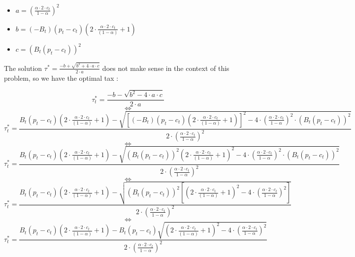 \documentclass{article}
\begin{document}
\begin{itemize}
    \item $a = \left(\frac{\alpha \cdot 2\cdot c_{t}}{1-\alpha}\right)^{2}$
    \item $b = \left(-B_{t}\right)\left(p_{t}-c_{t}\right)\left(2\cdot \frac{\alpha \cdot 2\cdot c_{t}}{(1-\alpha)}+1\right)$
    \item $c = \left(B_{t}(p_{t}-c_{t})\right)^{2}$
\end{itemize}
The solution $\tau^{*}=\frac{-b+\sqrt{b^2+4\cdot a\cdot c}}{2\cdot a}$ does not make sense in the context of this problem, so we have the optimal tax : 

\begin{equation*}
    \tau_{t}^{*}=\frac{-b-\sqrt{b^2-4\cdot a\cdot c}}{2\cdot a}
\end{equation*}
$$\iff$$
\begin{equation*}
    \tau_{t}^{*}=\frac{B_{t}\left(p_{t}-c_{t}\right)\left(2\cdot \frac{\alpha \cdot 2\cdot c_{t}}{(1-\alpha)}+1\right)-\sqrt{\left[\left(-B_{t}\right)\left(p_{t}-c_{t}\right)\left(2\cdot \frac{\alpha \cdot 2\cdot c_{t}}{(1-\alpha)}+1\right)\right]^2-4\cdot \left(\frac{\alpha \cdot 2\cdot c_{t}}{1-\alpha}\right)^{2}\cdot \left(B_{t}(p_{t}-c_{t})\right)^{2}}}{2\cdot \left(\frac{\alpha \cdot 2\cdot c_{t}}{1-\alpha}\right)^{2}}
\end{equation*}
$$\iff$$
\begin{equation*}
    \tau_{t}^{*}=\frac{B_{t}\left(p_{t}-c_{t}\right)\left(2\cdot \frac{\alpha \cdot 2\cdot c_{t}}{(1-\alpha)}+1\right)-\sqrt{\left(B_{t}\left(p_{t}-c_{t}\right)\right)^{2}\left(2\cdot \frac{\alpha \cdot 2\cdot c_{t}}{(1-\alpha)}+1\right)^2-4\cdot \left(\frac{\alpha \cdot 2\cdot c_{t}}{1-\alpha}\right)^{2}\cdot \left(B_{t}(p_{t}-c_{t})\right)^{2}}}{2\cdot \left(\frac{\alpha \cdot 2\cdot c_{t}}{1-\alpha}\right)^{2}}
\end{equation*}
$$\iff$$
\begin{equation*}
    \tau_{t}^{*}=\frac{B_{t}\left(p_{t}-c_{t}\right)\left(2\cdot \frac{\alpha \cdot 2\cdot c_{t}}{(1-\alpha)}+1\right)-\sqrt{\left(B_{t}\left(p_{t}-c_{t}\right)\right)^{2}\left[\left(2\cdot \frac{\alpha \cdot 2\cdot c_{t}}{(1-\alpha)}+1\right)^2-4\cdot \left(\frac{\alpha \cdot 2\cdot c_{t}}{1-\alpha}\right)^{2}\right]}}{2\cdot \left(\frac{\alpha \cdot 2\cdot c_{t}}{1-\alpha}\right)^{2}}
\end{equation*}
$$\iff$$
\begin{equation*}
    \tau_{t}^{*}=\frac{B_{t}\left(p_{t}-c_{t}\right)\left(2\cdot \frac{\alpha \cdot 2\cdot c_{t}}{(1-\alpha)}+1\right)-B_{t}\left(p_{t}-c_{t}\right)\sqrt{\left(2\cdot \frac{\alpha \cdot 2\cdot c_{t}}{(1-\alpha)}+1\right)^2-4\cdot \left(\frac{\alpha \cdot 2\cdot c_{t}}{1-\alpha}\right)^{2}}}{2\cdot \left(\frac{\alpha \cdot 2\cdot c_{t}}{1-\alpha}\right)^{2}}
\end{equation*}
\end{document}

